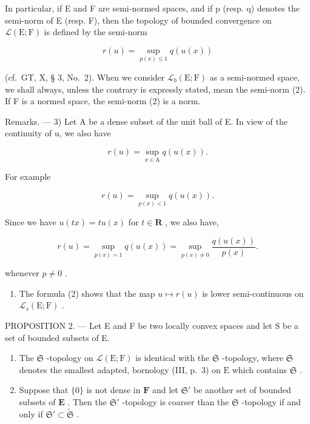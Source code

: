 In particular, if E and F are semi-normed spaces, and if p (resp. q) denotes the semi-norm of E (resp. F), then the topology of bounded convergence on \(\mathcal{L}(\mathrm{E};\mathrm{F})\) is defined by the semi-norm

\[
r (u) = \sup _ {p (x) \leqslant 1} q (u (x))\tag{2}
\]

(cf.~GT, X, § 3, No.~2). When we consider \(\mathcal{L}_b(\mathrm{E};\mathrm{F})\) as a semi-normed space, we shall always, unless the contrary is expressly stated, mean the semi-norm (2). If F is a normed space, the semi-norm (2) is a norm.

Remarks. --- 3) Let A be a dense subset of the unit ball of E. In view of the continuity of u, we also have

\[
r (u) = \sup _ {x \in \mathrm{A}} q (u (x)).\tag{3}
\]

For example

\[
r (u) = \sup _ {p (x) <   1} q (u (x)).\tag{4}
\]

Since we have \(u(tx) = tu(x)\) for \(t \in \mathbf{R}\) , we also have,

\[
r (u) = \sup _ {p (x) = 1} q (u (x)) = \sup _ {p (x) \neq 0} \frac {q (u (x))}{p (x)}.\tag{5}
\]

whenever \(p \neq 0\) .

\begin{enumerate}
\def\labelenumi{\arabic{enumi})}
\setcounter{enumi}{3}
\tightlist
\item
  The formula (2) shows that the map \(u \mapsto r(u)\) is lower semi-continuous on \(\mathcal{L}_s(\mathrm{E};\mathrm{F})\) .
\end{enumerate}

PROPOSITION 2. --- Let E and F be two locally convex spaces and let S be a set of bounded subsets of E.

\begin{enumerate}
\def\labelenumi{\arabic{enumi})}
\item
  The \(\mathfrak{S}\) -topology on \(\mathcal{L}(\mathrm{E};\mathrm{F})\) is identical with the \(\mathfrak{S}\) -topology, where \(\mathfrak{S}\) denotes the smallest adapted, bornology (III, p.~3) on \(\mathrm{E}\) which contains \(\mathfrak{S}\) .
\item
  Suppose that \(\{0\}\) is not dense in \(\mathbf{F}\) and let \(\mathfrak{S}'\) be another set of bounded subsets of \(\mathbf{E}\) . Then the \(\mathfrak{S}'\) -topology is coarser than the \(\mathfrak{S}\) -topology if and only if \(\mathfrak{S}' \subset \tilde{\mathfrak{S}}\) .
\end{enumerate}

